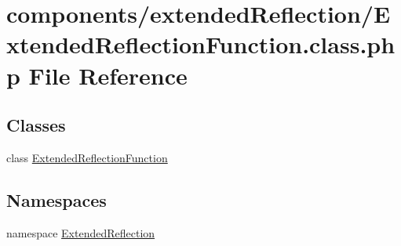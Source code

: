 \hypertarget{_extended_reflection_function_8class_8php}{
\section{components/extendedReflection/ExtendedReflectionFunction.class.php File Reference}
\label{_extended_reflection_function_8class_8php}
}
\subsection*{Classes}
\begin{CompactItemize}
\item 
class \hyperlink{class_extended_reflection_function}{ExtendedReflectionFunction}
\end{CompactItemize}
\subsection*{Namespaces}
\begin{CompactItemize}
\item 
namespace \hyperlink{namespace_extended_reflection}{ExtendedReflection}
\end{CompactItemize}
